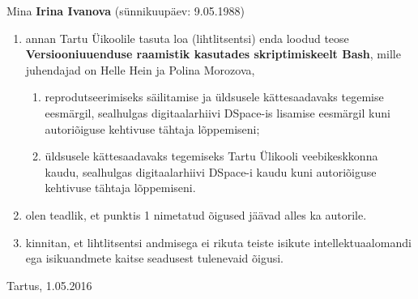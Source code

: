 \documentclass[12pt]{report}
\begin{document}
  Mina \textbf{Irina Ivanova} (sünnikuupäev: 9.05.1988)
  \begin{enumerate}
    \item annan Tartu Üikoolile tasuta loa (lihtlitsentsi) enda loodud teose \textbf{Versiooniuuenduse raamistik kasutades skriptimiskeelt Bash}, mille juhendajad on Helle Hein ja Polina Morozova,
    \begin{enumerate}
      \item reprodutseerimiseks säilitamise ja üldsusele kättesaadavaks tegemise eesmärgil, sealhulgas digitaalarhiivi DSpace-is lisamise eesmärgil kuni autoriõiguse kehtivuse tähtaja lõppemiseni;
      \item üldsusele kättesaadavaks tegemiseks Tartu Ülikooli veebikeskkonna kaudu, sealhulgas digitaalarhiivi DSpace-i kaudu kuni autoriõiguse kehtivuse tähtaja lõppemiseni.
    \end{enumerate}
    \item olen teadlik, et punktis 1 nimetatud õigused jäävad alles ka autorile.
    \item kinnitan, et lihtlitsentsi andmisega ei rikuta teiste isikute intellektuaalomandi ega isikuandmete kaitse seadusest tulenevaid õigusi.
  \end{enumerate}
  
  Tartus, 1.05.2016
\end{document}

